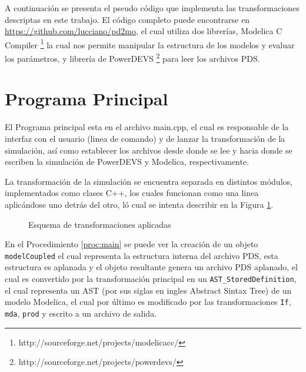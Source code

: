 	A continuación se presenta el pseudo código que implementa las transformaciones descriptas en este trabajo.
	El código completo puede encontrarse en \url{https://github.com/lucciano/pd2mo}, el cual utiliza dos librerías, Modelica C Compiler 
	\footnote{http://sourceforge.net/projects/modelicacc/} la cual nos permite manipular la estructura de los modelos y evaluar los parámetros,
	y librería de PowerDEVS \footnote{http://sourceforge.net/projects/powerdevs/} para leer los archivos PDS.


\section{Programa Principal}

El Programa principal esta en el archivo main.cpp, el cual es responsable de la interfaz con el usuario (linea de comando) y de lanzar la transformación de la simulación, así como establecer los archivos desde donde se lee y hacia donde se escriben la simulación de PowerDEVS y Modelica, respectivamente.

La transformación de la simulación se encuentra separada en distintos módulos, implementados como clases C++, los cuales funcionan como una linea aplicándose uno detrás del otro, ló cual se intenta
describir en la Figura \ref{fig:pipeline}.
\begin{figure}[H]
\centerfloat
{}
\caption{Esquema de transformaciones aplicadas}
\label{fig:pipeline}
\end{figure}

En el Procedimiento \ref{proc:main} se puede ver la creación de un objeto \texttt{modelCoupled} el cual representa la estructura interna del archivo PDS, 
esta estructura es aplanada y el objeto resultante genera un archivo PDS aplanado, el cual es convertido por la transformación principal en un 
	\texttt{AST\_StoredDefinition}, el cual representa un AST (por sus siglas en ingles Abstract Sintax Tree) de un modelo Modelica, el cual por último es 
	modificado por las transformaciones \texttt{If}, \texttt{mda}, \texttt{prod} y escrito a un archivo de salida.


